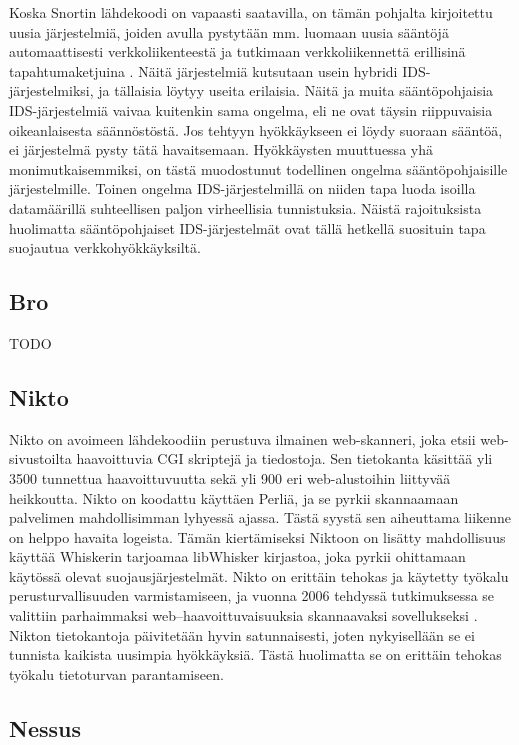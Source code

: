 Koska Snortin lähdekoodi on vapaasti saatavilla, on tämän pohjalta kirjoitettu uusia järjestelmiä, joiden avulla pystytään mm. luomaan uusia sääntöjä automaattisesti verkkoliikenteestä 
\cite{SnortRule} ja tutkimaan verkkoliikennettä erillisinä tapahtumaketjuina \cite{SnortSet}. Näitä järjestelmiä kutsutaan usein hybridi IDS-järjestelmiksi, ja tällaisia löytyy useita erilaisia. 
Näitä ja muita sääntöpohjaisia IDS-järjestelmiä vaivaa kuitenkin sama ongelma, eli ne ovat täysin riippuvaisia oikeanlaisesta säännöstöstä. Jos tehtyyn hyökkäykseen ei löydy suoraan sääntöä, 
ei järjestelmä pysty tätä havaitsemaan. Hyökkäysten muuttuessa yhä monimutkaisemmiksi, on tästä muodostunut todellinen ongelma sääntöpohjaisille järjestelmille. Toinen ongelma IDS-järjestelmillä
on niiden tapa luoda isoilla datamäärillä suhteellisen paljon virheellisia tunnistuksia. Näistä rajoituksista huolimatta sääntöpohjaiset IDS-järjestelmät ovat tällä hetkellä suosituin tapa
suojautua verkkohyökkäyksiltä. 

\subsection{Bro}

TODO

\subsection{Nikto}

Nikto \cite{Nikto} on avoimeen lähdekoodiin perustuva ilmainen web-skanneri, joka etsii web-sivustoilta haavoittuvia CGI skriptejä ja tiedostoja. Sen tietokanta käsittää
yli 3500 tunnettua haavoittuvuutta sekä yli 900 eri web-alustoihin liittyvää heikkoutta. Nikto on koodattu käyttäen Perliä, ja se pyrkii skannaamaan palvelimen 
mahdollisimman lyhyessä ajassa. Tästä syystä sen aiheuttama liikenne on helppo havaita logeista. Tämän kiertämiseksi Niktoon on lisätty mahdollisuus käyttää Whiskerin
tarjoamaa libWhisker kirjastoa, joka pyrkii ohittamaan käytössä olevat suojausjärjestelmät. Nikto on erittäin tehokas ja käytetty työkalu perusturvallisuuden 
varmistamiseen, ja vuonna 2006 tehdyssä tutkimuksessa se valittiin parhaimmaksi web--haavoittuvaisuuksia skannaavaksi sovellukseksi \cite{INS}.
Nikton tietokantoja päivitetään hyvin satunnaisesti, joten nykyisellään se ei tunnista kaikista uusimpia hyökkäyksiä. Tästä huolimatta se on erittäin tehokas työkalu 
tietoturvan parantamiseen.

\subsection{Nessus}

